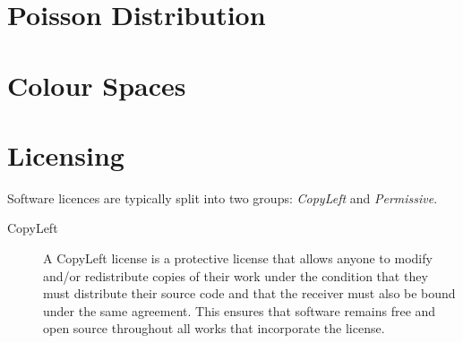 \section{Poisson Distribution}\label{ref:app:poisson}
\section{Colour Spaces}\label{ref:app:colour}
\section{Licensing}\label{ref:app:licensing}

Software licences are typically split into two groups: \textit{CopyLeft} and \textit{Permissive}.

\begin{description}
\item[CopyLeft]{
A CopyLeft license is a protective license that allows anyone to modify and/or redistribute copies of their work under the condition that they must distribute their source code and that the receiver must also be bound under the same agreement. This ensures that software remains free and open source throughout all works that incorporate the license.

}
\end{description}
